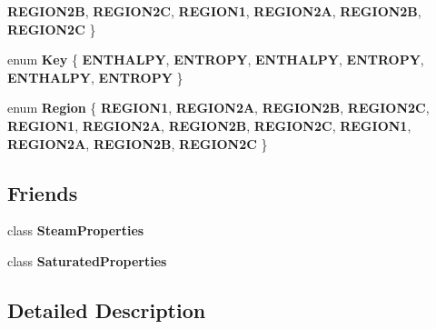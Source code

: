 \begin{DoxyCompactItemize}
{\bfseries R\+E\+G\+I\+O\+N2B}, 
{\bfseries R\+E\+G\+I\+O\+N2C}, 
\newline
{\bfseries R\+E\+G\+I\+O\+N1}, 
{\bfseries R\+E\+G\+I\+O\+N2A}, 
{\bfseries R\+E\+G\+I\+O\+N2B}, 
{\bfseries R\+E\+G\+I\+O\+N2C}
 \}
\item 
\mbox{\label{class_steam_system_modeler_tool_aed38516c350ca4ecf17b545e07d41dcd}} 
enum {\bfseries Key} \{ \newline
{\bfseries E\+N\+T\+H\+A\+L\+PY}, 
{\bfseries E\+N\+T\+R\+O\+PY}, 
{\bfseries E\+N\+T\+H\+A\+L\+PY}, 
{\bfseries E\+N\+T\+R\+O\+PY}, 
\newline
{\bfseries E\+N\+T\+H\+A\+L\+PY}, 
{\bfseries E\+N\+T\+R\+O\+PY}
 \}
\item 
\mbox{\label{class_steam_system_modeler_tool_a162eeadc7eb56a9b50b7a8f630eb8f05}} 
enum {\bfseries Region} \{ \newline
{\bfseries R\+E\+G\+I\+O\+N1}, 
{\bfseries R\+E\+G\+I\+O\+N2A}, 
{\bfseries R\+E\+G\+I\+O\+N2B}, 
{\bfseries R\+E\+G\+I\+O\+N2C}, 
\newline
{\bfseries R\+E\+G\+I\+O\+N1}, 
{\bfseries R\+E\+G\+I\+O\+N2A}, 
{\bfseries R\+E\+G\+I\+O\+N2B}, 
{\bfseries R\+E\+G\+I\+O\+N2C}, 
\newline
{\bfseries R\+E\+G\+I\+O\+N1}, 
{\bfseries R\+E\+G\+I\+O\+N2A}, 
{\bfseries R\+E\+G\+I\+O\+N2B}, 
{\bfseries R\+E\+G\+I\+O\+N2C}
 \}
\end{DoxyCompactItemize}
\subsection*{Friends}
\begin{DoxyCompactItemize}
\item 
\mbox{\label{class_steam_system_modeler_tool_a7e1e8a7691c09b03ba5c48246617deba}} 
class {\bfseries Steam\+Properties}
\item 
\mbox{\label{class_steam_system_modeler_tool_aa9f8025f33479e7f4a9640c0ac39d2f6}} 
class {\bfseries Saturated\+Properties}
\end{DoxyCompactItemize}


\subsection{Detailed Description}



